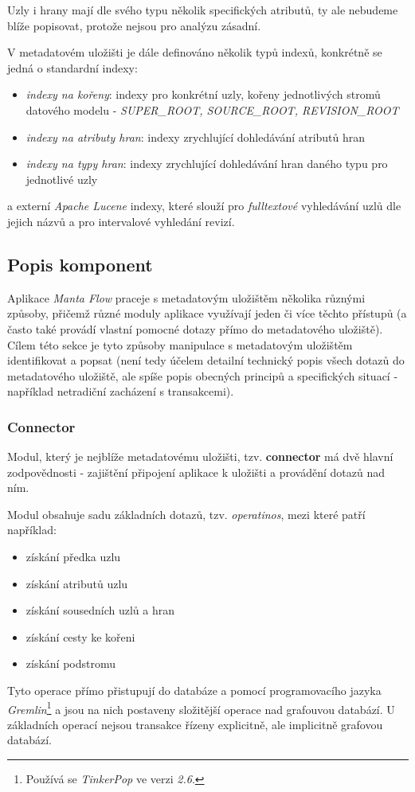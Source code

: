 Uzly i hrany mají dle svého typu několik specifických atributů, ty ale nebudeme blíže popisovat, protože nejsou pro analýzu zásadní. 

V metadatovém uložišti je dále definováno několik typů indexů, konkrétně se jedná o standardní indexy:

\begin{itemize}
	\item{\textit{indexy na kořeny}}: indexy pro konkrétní uzly, kořeny jednotlivých stromů datového modelu - \textit{SUPER\_ROOT, SOURCE\_ROOT, REVISION\_ROOT}
	\item{\textit{indexy na atributy hran}}: indexy zrychlující dohledávání atributů hran
	\item{\textit{indexy na typy hran}}: indexy zrychlující dohledávání hran daného typu pro jednotlivé uzly
\end{itemize}

a externí \textit{Apache Lucene} indexy, které slouží pro \textit{fulltextové} vyhledávání uzlů dle jejich názvů a pro intervalové vyhledání revizí. 

\subsection{Popis komponent}
\label{sec:ana_components}

Aplikace \textit{Manta Flow} praceje s metadatovým uložištěm několika různými způsoby, přičemž různé moduly aplikace využívají jeden či více těchto přístupů (a často také provádí vlastní pomocné dotazy přímo do metadatového uložiště). Cílem této sekce je tyto způsoby manipulace s metadatovým uložištěm identifikovat a popsat (není tedy účelem detailní technický popis všech dotazů do metadatového uložiště, ale spíše popis obecných principů a specifických situací - například netradiční zacházení s transakcemi). 

\subsubsection{Connector}
\label{sec:ana_connector}
Modul, který je nejblíže metadatovému uložišti, tzv. \textbf{connector} má dvě hlavní zodpovědnosti - zajištění připojení aplikace k uložišti a provádění dotazů nad ním. 

Modul obsahuje sadu základních dotazů, tzv. \textit{operatinos}, mezi které patří například: 
\begin{itemize}
	\item{získání předka uzlu}
	\item{získání atributů uzlu}
	\item{získání sousedních uzlů a hran}
	\item{získání cesty ke kořeni}
	\item{získání podstromu}
\end{itemize} 
Tyto operace přímo přistupují do databáze a pomocí programovacího jazyka \textit{Gremlin}\footnote{Používá se \textit{TinkerPop} ve verzi \textit{2.6}.} a jsou na nich postaveny složitější operace nad grafouvou databází. U základních operací nejsou transakce řízeny explicitně, ale implicitně grafovou databází.

